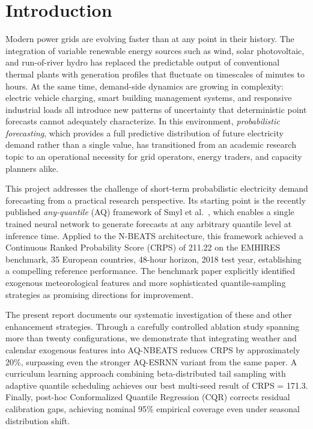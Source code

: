 \chapter*{Introduction}
\label{chap:introduction}

\noindent
Modern power grids are evolving faster than at any point in their history.
The integration of variable renewable energy sources such as wind, solar
photovoltaic, and run-of-river hydro has replaced the predictable output
of conventional thermal plants with generation profiles that fluctuate on
timescales of minutes to hours. At the same time, demand-side dynamics are
growing in complexity: electric vehicle charging, smart building management
systems, and responsive industrial loads all introduce new patterns of
uncertainty that deterministic point forecasts cannot adequately characterize.
In this environment, \emph{probabilistic forecasting}, which provides a
full predictive distribution of future electricity demand rather than a single
value, has transitioned from an academic research topic to an operational
necessity for grid operators, energy traders, and capacity planners alike.

\vspace{0.5cm}

\noindent
This project addresses the challenge of short-term probabilistic electricity
demand forecasting from a practical research perspective. Its starting point
is the recently published \emph{any-quantile} (AQ) framework of Smyl et
al.~\cite{smyl2025anyquantile}, which enables a single trained neural network
to generate forecasts at any arbitrary quantile level at inference time.
Applied to the N-BEATS architecture, this framework achieved a Continuous
Ranked Probability Score (CRPS) of 211.22 on the EMHIRES benchmark, 35
European countries, 48-hour horizon, 2018 test year, establishing a
compelling reference performance. The benchmark paper explicitly
identified exogenous meteorological features and more sophisticated
quantile-sampling strategies as promising directions for improvement.

\vspace{0.5cm}

\noindent
The present report documents our systematic investigation of these and
other enhancement strategies. Through a carefully controlled ablation study
spanning more than twenty configurations, we demonstrate that integrating
weather and calendar exogenous features into AQ-NBEATS reduces CRPS by
approximately 20\%, surpassing even the stronger AQ-ESRNN variant from
the same paper. A curriculum learning approach combining beta-distributed
tail sampling with adaptive quantile scheduling achieves our best
multi-seed result of CRPS = 171.3. Finally, post-hoc Conformalized
Quantile Regression (CQR) corrects residual calibration gaps, achieving
nominal 95\% empirical coverage even under seasonal distribution shift.


